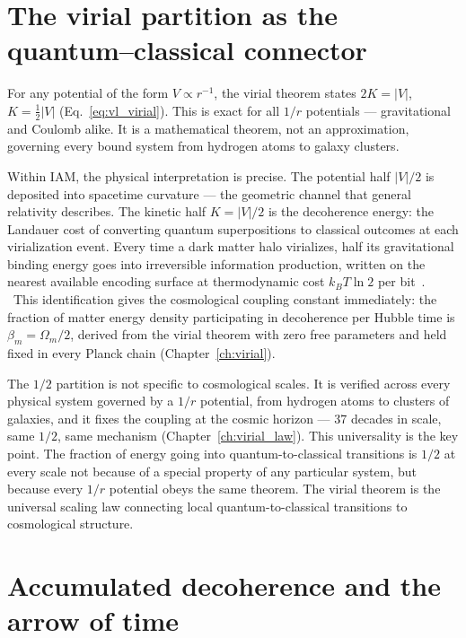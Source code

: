\section{The virial partition as the quantum--classical connector}\label{sec:vd_connector}
For any potential of the form $V\propto r^{-1}$, the virial theorem states $2K=|V|$, $K=\tfrac12|V|$ (Eq.~\eqref{eq:vl_virial}). This is exact for all $1/r$
potentials --- gravitational and Coulomb alike. It is a mathematical theorem, not an approximation, governing every bound system from hydrogen atoms to
galaxy clusters. \derived

Within IAM, the physical interpretation is precise. The potential half $|V|/2$ is deposited into spacetime curvature --- the geometric channel that general
relativity describes. The kinetic half $K=|V|/2$ is the decoherence energy: the Landauer cost of converting quantum superpositions to classical outcomes at
each virialization event. Every time a dark matter halo virializes, half its gravitational binding energy goes into irreversible information production,
written on the nearest available encoding surface at thermodynamic cost $k_BT\ln2$ per bit~\cite{Landauer1961}. \interp\ This identification gives the
cosmological coupling constant immediately: the fraction of matter energy density participating in decoherence per Hubble time is $\beta_m=\Omega_m/2$,
derived from the virial theorem with zero free parameters and held fixed in every Planck chain (Chapter~\ref{ch:virial}).

The $1/2$ partition is not specific to cosmological scales. It is verified across every physical system governed by a $1/r$ potential, from hydrogen atoms
to clusters of galaxies, and it fixes the coupling at the cosmic horizon --- 37 decades in scale, same $1/2$, same mechanism (Chapter~\ref{ch:virial_law}).
This universality is the key point. The fraction of energy going into quantum-to-classical transitions is $1/2$ at every scale not because of a special
property of any particular system, but because every $1/r$ potential obeys the same theorem. The virial theorem is the universal scaling law connecting local
quantum-to-classical transitions to cosmological structure. \interp

\section{Accumulated decoherence and the arrow of time}\label{sec:vd_arrow}
